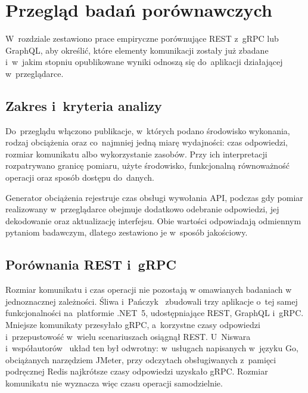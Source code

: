 \cleardoublepage

\chapter{Przegląd badań porównawczych}
\label{cha:StanBadan}

W~rozdziale zestawiono prace empiryczne porównujące REST z~gRPC lub GraphQL, aby określić, które elementy komunikacji zostały już zbadane i~w~jakim stopniu opublikowane wyniki odnoszą się do~aplikacji działającej w~przeglądarce.

\section{Zakres i~kryteria analizy}
\label{sec:KryteriaPrzegladu}

Do~przeglądu włączono publikacje, w~których podano środowisko wykonania, rodzaj obciążenia oraz co~najmniej jedną miarę wydajności: czas odpowiedzi, rozmiar komunikatu albo wykorzystanie zasobów. Przy ich interpretacji rozpatrywano granicę pomiaru, użyte środowisko, funkcjonalną równoważność operacji oraz sposób dostępu do~danych.

Generator obciążenia rejestruje czas obsługi wywołania API, podczas gdy pomiar realizowany w~przeglądarce obejmuje dodatkowo odebranie odpowiedzi, jej dekodowanie oraz aktualizację interfejsu. Obie wartości odpowiadają odmiennym pytaniom badawczym, dlatego zestawiono je w~sposób jakościowy.

\section{Porównania REST i~gRPC}
\label{sec:PorownaniaRestGrpc}

Rozmiar komunikatu i czas operacji nie pozostają w omawianych badaniach w jednoznacznej zależności. Śliwa i~Pańczyk~\cite{bib:SliwaPanczyk2021} zbudowali trzy aplikacje o~tej samej funkcjonalności na~platformie .NET~5, udostępniające REST, GraphQL i~gRPC. Mniejsze komunikaty przesyłało gRPC, a~korzystne czasy odpowiedzi i~przepustowość w~wielu scenariuszach osiągnął REST. U~Niswara i~współautorów~\cite{bib:Niswar2024} układ ten był odwrotny: w~usługach napisanych w~języku Go, obciążanych narzędziem JMeter, przy odczytach obsługiwanych z~pamięci podręcznej Redis najkrótsze czasy odpowiedzi uzyskało gRPC. Rozmiar komunikatu nie wyznacza więc czasu operacji samodzielnie.

